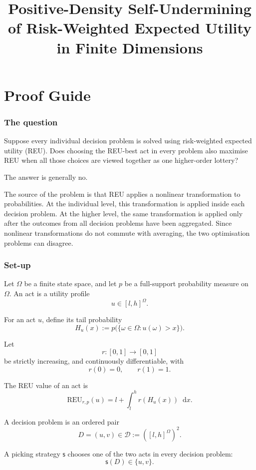 \documentclass[a4paper,final]{article}
\newcommand\REU{\mathrm{REU}}
\newcommand{\D}{\mathcal{D}}
\newcommand\s{\mathsf{s}}
\newcommand*\diff{\mathop{}\!\mathrm{d}}
\newenvironment{CCM rewritten}
{\begingroup\color{blue}} %
{\endgroup}              %
\begin{document}
\title{Positive-Density Self-Undermining of Risk-Weighted Expected Utility in Finite Dimensions}
\author{}
\date{}
\maketitle

\part{Proof Guide}

\section{The question}

Suppose every individual decision problem is solved using risk-weighted
expected utility (REU). Does choosing the REU-best act in every problem
also maximise REU when all those choices are viewed together as one
higher-order lottery?

The answer is generally no.

The source of the problem is that REU applies a nonlinear transformation
to probabilities. At the individual level, this transformation is applied
inside each decision problem. At the higher level, the same transformation
is applied only after the outcomes from all decision problems have been
aggregated. Since nonlinear transformations do not commute with averaging,
the two optimisation problems can disagree.

\section{Set-up}

Let $\Omega$ be a finite state space, and let $p$ be a full-support
probability measure on $\Omega$. An act is a utility profile
\[
u\in[l,h]^\Omega.
\]

For an act $u$, define its tail probability
\[
H_u(x)
:=
p\bigl(\{\omega\in\Omega:u(\omega)>x\}\bigr).
\]

Let
\[
r:[0,1]\to[0,1]
\]
be strictly increasing, and continuously differentiable, with
\[
r(0)=0,
\qquad
r(1)=1.
\]

The REU value of an act is
\[
\REU_{r,p}(u)
=
l+\int_l^h r(H_u(x))\diff x.
\]

A decision problem is an ordered pair
\[
D=(u,v)\in\D:=([l,h]^\Omega)^2.
\]

A picking strategy $\s$ chooses one of the two acts in every decision
problem:
\[
\s(D)\in\{u,v\}.
\]
\end{document}
